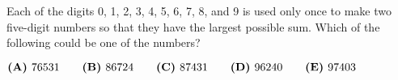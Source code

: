 

Each of the digits 0, 1, 2, 3, 4, 5, 6, 7, 8, and 9 is used only once to make two five-digit numbers so that they have the largest possible sum. Which of the following could be one of the numbers?

$\textbf{(A)}\hspace{.05in}76531 \qquad \textbf{(B)}\hspace{.05in}86724 \qquad \textbf{(C)}\hspace{.05in}87431 \qquad \textbf{(D)}\hspace{.05in}96240 \qquad \textbf{(E)}\hspace{.05in}97403 $